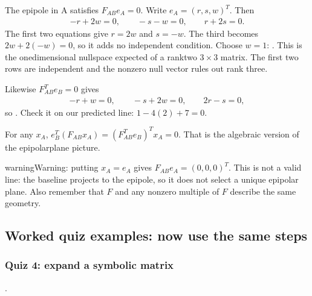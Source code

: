 \documentclass[letterpaper,11pt,english,openany,oneside]{jupyterBook}
\begin{document}
\sphinxAtStartPar
{} The epipole in A satisfies \(F_{AB}e_A=0\). Write \(e_A=(r,s,w)^T\). Then
\begin{equation*}
\begin{split}
-r+2w=0,\qquad -s-w=0,\qquad r+2s=0.
\end{split}
\end{equation*}
\sphinxAtStartPar
The first two equations give \(r=2w\) and \(s=-w\). The third becomes \(2w+2(-w)=0\), so it adds no independent condition. Choose \(w=1\): . This is the one\sphinxhyphen{}dimensional nullspace expected of a rank\sphinxhyphen{}two \(3\times3\) matrix. The first two rows are independent and the nonzero null vector rules out rank three.

\sphinxAtStartPar
Likewise \(F_{AB}^Te_B=0\) gives
\begin{equation*}
\begin{split}-r+w=0,\qquad -s+2w=0,\qquad 2r-s=0,\end{split}
\end{equation*}
\sphinxAtStartPar
so . Check it on our predicted line: \(1-4(2)+7=0\).

\sphinxAtStartPar
{} For any \(x_A\),
\(e_B^T(F_{AB}x_A)=(F_{AB}^Te_B)^Tx_A=0\).
That is the algebraic version of the epipolar\sphinxhyphen{}plane picture.

\begin{sphinxadmonition}{warning}{Warning:}
\sphinxAtStartPar
{} putting \(x_A=e_A\) gives \(F_{AB}e_A=(0,0,0)^T\). This is not a valid line: the baseline projects to the epipole, so it does not select a unique epipolar plane. Also remember that \(F\) and any nonzero multiple of \(F\) describe the same geometry.
\end{sphinxadmonition}


\subsection{Worked quiz examples: now use the same steps}
\label{\detokenize{lectures/lecture04/epipolar-practice:worked-quiz-examples-now-use-the-same-steps}}

\subsubsection{Quiz 4: expand a symbolic matrix}
\label{\detokenize{lectures/lecture04/epipolar-practice:quiz-4-expand-a-symbolic-matrix}}
\sphinxAtStartPar
{} {\hyperref[\detokenize{lectures/lecture04/quiz-workbook:quiz-1-q1}]{}}.
\end{document}
